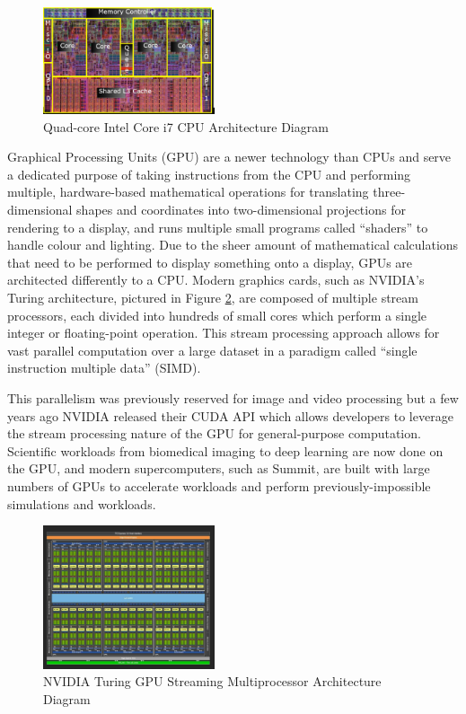 \documentclass[conference]{IEEEtran}
\begin{document}
\begin{figure}
\centering
\includegraphics[width=0.45\textwidth]{cpu_diagram.png}
\caption{Quad-core Intel Core i7 CPU Architecture Diagram}
\label{fig:cpu_diagram}
\end{figure}


Graphical Processing Units (GPU) are a newer technology than CPUs and serve a dedicated purpose of taking instructions from the CPU and performing multiple, hardware-based mathematical operations for translating three-dimensional shapes and coordinates into two-dimensional projections for rendering to a display, and runs multiple small programs called ``shaders” to handle colour and lighting. Due to the sheer amount of mathematical calculations that need to be performed to display something onto a display, GPUs are architected differently to a CPU. Modern graphics cards, such as NVIDIA’s Turing architecture, pictured in Figure \ref{fig:gpu_diagram}, are composed of multiple stream processors, each divided into hundreds of small cores which perform a single integer or floating-point operation. This stream processing approach allows for vast parallel computation over a large dataset in a paradigm called ``single instruction multiple data” (SIMD).

This parallelism was previously reserved for image and video processing but a few years ago NVIDIA released their CUDA API\cite{cuda_talk}\cite{CUDA} which allows developers to leverage the stream processing nature of the GPU for general-purpose computation. Scientific workloads from biomedical imaging\cite{luebke2008cuda} to deep learning\cite{tang2013deep} are now done on the GPU, and modern supercomputers, such as Summit, are built with large numbers of GPUs to accelerate workloads and perform previously-impossible simulations and workloads.

\begin{figure}
\centering
\includegraphics[width=0.45\textwidth]{gpu_diagram.jpg}
\caption{NVIDIA Turing GPU Streaming Multiprocessor Architecture Diagram}
\label{fig:gpu_diagram}
\end{figure}
\end{document}
